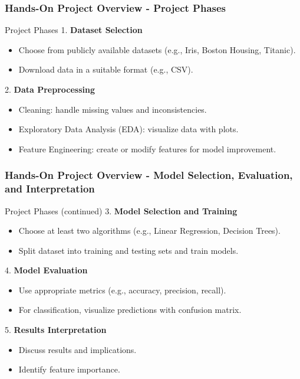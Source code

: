 \documentclass[aspectratio=169]{beamer}
\begin{document}
\begin{frame}[fragile]
    \frametitle{Hands-On Project Overview - Project Phases}
    \begin{block}{Project Phases}
        1. \textbf{Dataset Selection}
        \begin{itemize}
            \item Choose from publicly available datasets (e.g., Iris, Boston Housing, Titanic).
            \item Download data in a suitable format (e.g., CSV).
        \end{itemize}
        
        2. \textbf{Data Preprocessing}
        \begin{itemize}
            \item Cleaning: handle missing values and inconsistencies.
            \item Exploratory Data Analysis (EDA): visualize data with plots.
            \item Feature Engineering: create or modify features for model improvement.
        \end{itemize} 
    \end{block}
\end{frame}

\begin{frame}[fragile]
    \frametitle{Hands-On Project Overview - Model Selection, Evaluation, and Interpretation}
    \begin{block}{Project Phases (continued)}
        3. \textbf{Model Selection and Training}
        \begin{itemize}
            \item Choose at least two algorithms (e.g., Linear Regression, Decision Trees).
            \item Split dataset into training and testing sets and train models.
        \end{itemize}
        
        4. \textbf{Model Evaluation}
        \begin{itemize}
            \item Use appropriate metrics (e.g., accuracy, precision, recall).
            \item For classification, visualize predictions with confusion matrix.
        \end{itemize}
        
        5. \textbf{Results Interpretation}
        \begin{itemize}
            \item Discuss results and implications.
            \item Identify feature importance.
        \end{itemize}
    \end{block}
\end{frame}
\end{document}
